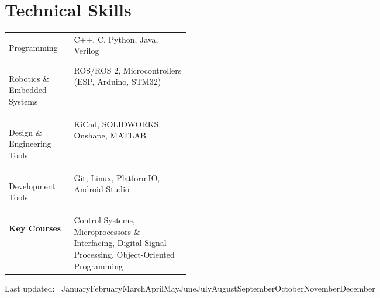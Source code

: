 \documentclass[a4paper,12pt]{article}
\begin{document}
\section{Technical Skills}
\begin{tabularx}{\linewidth}{@{}>{\bfseries\raggedright\arraybackslash}p{0.36\linewidth} >{\raggedright\arraybackslash}X@{}}
	Programming & C++, C, Python, Java, Verilog \\
	Robotics \& Embedded Systems & ROS/ROS 2, Microcontrollers (ESP, Arduino, STM32) \\
	Design \& Engineering Tools & KiCad, SOLIDWORKS, Onshape, MATLAB \\
	Development Tools & Git, Linux, PlatformIO, Android Studio \\
	\textbf{Key Courses} & Control Systems, Microprocessors \& Interfacing, Digital Signal Processing, Object-Oriented Programming\\
\end{tabularx}

\vfill
{\centering\footnotesize Last updated: \number\day~\ifcase\month\or January\or February\or March\or April\or May\or June\or July\or August\or September\or October\or November\or December\fi~\number\year\par}
\end{document}
